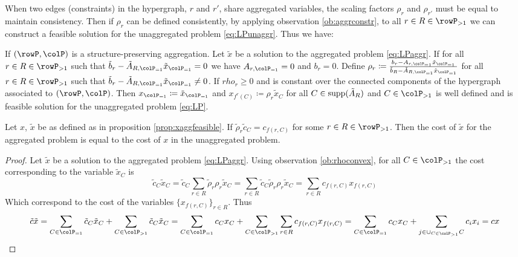 {When two edges (constraints) in the hypergraph, \(r\) and \(r'\), share aggregated variables, the scaling factors \(\rho_r\) and \(\rho_{r'}\) must be equal to maintain consistency. 
Then if \(\rho_r\) can be defined consistently, by applying observation \ref{ob:aggrconstr}, to all \(r \in R \in \rowP_{>1}\) we can construct a feasible solution for the unaggregated problem \eqref{eq:LPunaggr}. Thus we have: 
\begin{proposition}
\label{prop:xaggfeasible}
If \((\rowP, \colP)\) is a structure-preserving aggregation. Let \(\tilde{x}\) be a solution 
to the aggregated problem \eqref{eq:LPaggr}. If for all \(r \in R \in \rowP_{>1}\) such that  \(\tilde{b}_r - \tilde{A}_{R, \colP_{=1}} \tilde{x}_{\colP_{=1}} = 0\) we have \(A_{r,\colP_{=1}} = 0\) and \(b_r=0\).
Define \(\rho_r \coloneqq \frac{b_r - A_{r, \colP_{=1}} \tilde{x}_{\colP_{=1}}}{\tilde{b}_R - \tilde{A}_{R, \colP_{=1}} \tilde{x}_{\colP_{=1}}}\) for all \(r \in R \in \rowP_{>1}\) such that   \(\tilde{b}_r - \tilde{A}_{R, \colP_{=1}} \tilde{x}_{\colP_{=1}} \neq 0\). If \(rho_r \geq 0\) and is constant over the connected components of the hypergraph associated to \((\rowP, \colP)\). 
Then \(x_{\colP_{=1}} \coloneqq \tilde{x}_{\colP_{=1}}\) and \(x_{f^r(C)} \coloneqq \rho_r \tilde{x}_C\) for all \(C \in \operatorname{supp}(\tilde{A}_R)\) and \(C \in \colP_{>1}\) is well defined and is feasible solution for the unaggregated problem \eqref{eq:LP}.
\end{proposition}


\begin{observation}
  \label{ob:costpreserving}
  Let \(x\), \(\tilde{x}\) be as defined as in proposition \ref{prop:xaggfeasible}. If \(\tilde{\rho}_r\tilde{c}_C = c_{f(r,C)}\) for some \(r \in R \in \rowP_{>1}\). Then the cost of \(\tilde{x}\) for the aggregated problem 
  is equal to the cost of \(x\) in the unaggregated problem. 
\end{observation}
\begin{proof}
  Let \(\tilde{x}\) be a solution to the aggregated problem \eqref{eq:LPaggr}. Using observation \ref{ob:rhoconvex}, for all \(C \in \colP_{>1}\) the cost corresponding to the variable \(\tilde{x}_C\) is 
  \[
  \tilde{c}_C\tilde{x}_C = \tilde{c}_C\sum_{r \in R}\tilde{\rho}_r\rho_r\tilde{x}_C = \sum_{r \in R}\tilde{c}_C\tilde{\rho}_r\rho_r\tilde{x}_C  = \sum_{r \in R}c_{f(r,C)}x_{f(r,C)}
  \]
  Which correspond to the cost of the variables \(\{x_{f(r,C)}\}_{r \in R}\). Thus
  \[
  \tilde{c}\tilde{x} = \sum_{C \in \colP_{=1}}\tilde{c}_C\tilde{x}_C + \sum_{C \in \colP_{>1}}\tilde{c}_C\tilde{x}_C = \sum_{C \in \colP_{=1}}c_Cx_C + \sum_{C \in \colP_{>1}}\sum_{r \in R}c_{f(r,C)}x_{f(r,C)} =  \sum_{C \in \colP_{=1}}c_Cx_C + \sum_{j \in \cup_{C \in \colP_{>1}}C}c_{i}x_{i} =  cx
  \]


\end{proof}}
